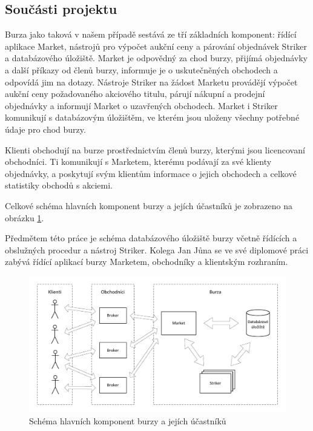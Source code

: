 \documentclass[thesis=M,czech]{FITthesis}[2012/06/26]
\begin{document}

\subsection{Součásti projektu}
\label{sec:proj-parts}

Burza jako taková v našem případě sestává ze tří základních komponent: řídící aplikace Market, nástrojů pro výpočet aukční ceny
a párování objednávek Striker a databázového úložiště. Market je odpovědný za chod burzy, přijímá objednávky a další příkazy 
od členů burzy, informuje je o uskutečněných obchodech a odpovídá jim na dotazy. Nástroje Striker na žádost Marketu provádějí
výpočet aukční ceny požadovaného akciového titulu, párují nákupní a prodejní objednávky a informují Market o uzavřených 
obchodech. Market i Striker komunikují s databázovým úložištěm, ve kterém jsou uloženy všechny potřebné údaje pro chod burzy.

Klienti obchodují na burze prostřednictvím členů burzy, kterými jsou licencovaní obchodníci. Ti komunikují s Marketem, kterému 
podávají za své klienty objednávky, a poskytují svým klientům informace o jejich obchodech a celkové statistiky obchodů s akciemi.

Celkové schéma hlavních komponent burzy a jejích účastníků je zobrazeno na obrázku \ref{fig:global-schema}.

Předmětem této práce je schéma databázového úložiště burzy včetně řídících a obslužných procedur a nástroj Striker. Kolega 
Jan Jůna se ve své diplomové práci \cite{junadip} zabývá řídící aplikací burzy Marketem, obchodníky a klientským rozhraním.


\begin{figure}\centering
	\includegraphics[width=\textwidth]{images/global-schema} 
	\caption[Schéma burzy]{Schéma hlavních komponent burzy a jejích účastníků}\label{fig:global-schema}
\end{figure}
\end{document}
